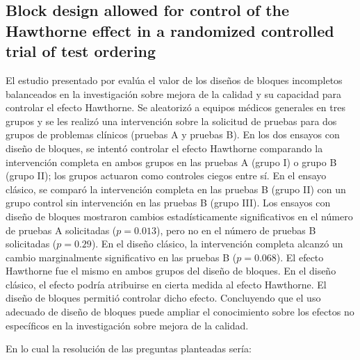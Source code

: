 \subsection{Block design allowed for control of the Hawthorne effect in a randomized controlled trial of test ordering}

El estudio presentado por \cite{verstappen2004block} evalúa el valor de los diseños de bloques incompletos balanceados en la investigación sobre mejora de la calidad y su capacidad para controlar el efecto Hawthorne. Se aleatorizó a equipos médicos generales en tres grupos y se les realizó una intervención sobre la solicitud de pruebas para dos grupos de problemas clínicos (pruebas A y pruebas B). En los dos ensayos con diseño de bloques, se intentó controlar el efecto Hawthorne comparando la intervención completa en ambos grupos en las pruebas A (grupo I) o grupo B (grupo II); los grupos actuaron como controles ciegos entre sí. En el ensayo clásico, se comparó la intervención completa en las pruebas B (grupo II) con un grupo control sin intervención en las pruebas B (grupo III). Los ensayos con diseño de bloques mostraron cambios estadísticamente significativos en el número de pruebas A solicitadas ($p = 0.013$), pero no en el número de pruebas B solicitadas ($p = 0.29$). En el diseño clásico, la intervención completa alcanzó un cambio marginalmente significativo en las pruebas B ($p = 0.068$). El efecto Hawthorne fue el mismo en ambos grupos del diseño de bloques. En el diseño clásico, el efecto podría atribuirse en cierta medida al efecto Hawthorne. El diseño de bloques permitió controlar dicho efecto. Concluyendo que el uso adecuado de diseño de bloques puede ampliar el conocimiento sobre los efectos no específicos en la investigación sobre mejora de la calidad.

En lo cual la resolución de las preguntas planteadas sería:

